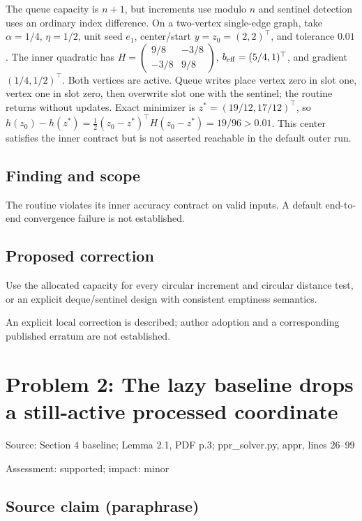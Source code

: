 \documentclass[11pt]{article}
\begin{document}
The queue capacity is \(n+1\), but increments use modulo \(n\) and sentinel detection uses an ordinary index difference. On a two-vertex single-edge graph, take \(\alpha=1/4\), \(\eta=1/2\), unit seed \(e_1\), center/start \(y=z_0=(2,2)^\top\), and tolerance \(0.01\). The inner quadratic has \(H=\begin{pmatrix}9/8&-3/8\\-3/8&9/8\end{pmatrix}\), \(b_{\rm eff}=(5/4,1)^\top\), and gradient \((1/4,1/2)^\top\). Both vertices are active. Queue writes place vertex zero in slot one, vertex one in slot zero, then overwrite slot one with the sentinel; the routine returns without updates. Exact minimizer is \(z^*=(19/12,17/12)^\top\), so \(h(z_0)-h(z^*)=\tfrac12(z_0-z^*)^\top H(z_0-z^*)=19/96>0.01\). This center satisfies the inner contract but is not asserted reachable in the default outer run.

\subsection*{Finding and scope}

The routine violates its inner accuracy contract on valid inputs. A default end-to-end convergence failure is not established.

\subsection*{Proposed correction}

Use the allocated capacity for every circular increment and circular distance test, or an explicit deque/sentinel design with consistent emptiness semantics.

An explicit local correction is described; author adoption and a corresponding published erratum are not established.

\section*{Problem 2: The lazy baseline drops a still-active processed coordinate}

Source: Section 4 baseline; Lemma 2.1, PDF p.3; ppr\_solver.py, appr, lines 26–99

Assessment: supported; impact: minor

\subsection*{Source claim (paraphrase)}
\end{document}
